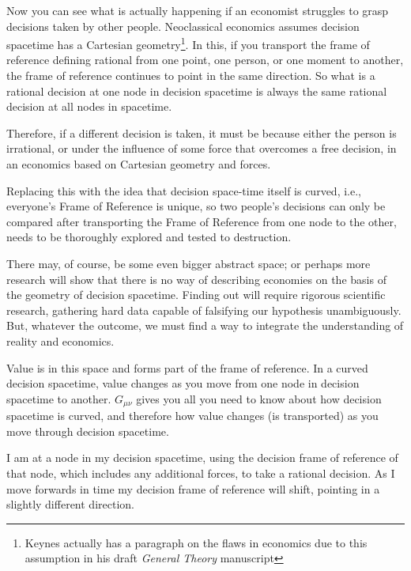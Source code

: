 Now you can see what is actually happening if an economist struggles to grasp decisions taken by other people. Neoclassical economics  assumes decision spacetime has a Cartesian geometry\footnote{Keynes  actually has a paragraph on the flaws in economics due to this assumption in his draft \emph{General Theory}  manuscript\cite{galbraith-keynes, keynes-collected-writing}}. In this, if you transport the frame of reference defining rational from one point, one person, or one moment to another, the frame of reference continues to point in the same direction. So what is a rational decision at one node in decision spacetime is always the same rational decision at all nodes in spacetime.


Therefore, if a different decision is taken, it must be because either the person is irrational, or under the influence of some force that overcomes a free decision, in an economics based on Cartesian geometry and forces.


Replacing this with the idea that decision space-time itself is curved, i.e., everyone’s Frame of Reference is unique, so two people’s decisions can only be compared after transporting the Frame of Reference from one node to the other, needs to be thoroughly explored and tested to destruction. 


There may, of course, be some even bigger abstract space; or perhaps more research will show that there is no way of describing economies on the basis of the geometry of decision spacetime. Finding out will require rigorous scientific research, gathering hard data capable of falsifying our hypothesis unambiguously. But, whatever the outcome, we must find a way to integrate the understanding of reality and economics. 


Value is in this space and forms part of the frame of reference. In a curved decision spacetime, value changes as you move from one node in decision spacetime to another. $G_{\mu\nu}$ gives you all you need to know about how decision spacetime is curved, and therefore how value changes (is transported) as you move through decision spacetime.


I am at a node in my decision spacetime, using the decision frame of reference of that node, which includes any additional forces, to take a rational decision. As I move forwards in time my decision frame of reference will shift, pointing in a slightly different direction. 


